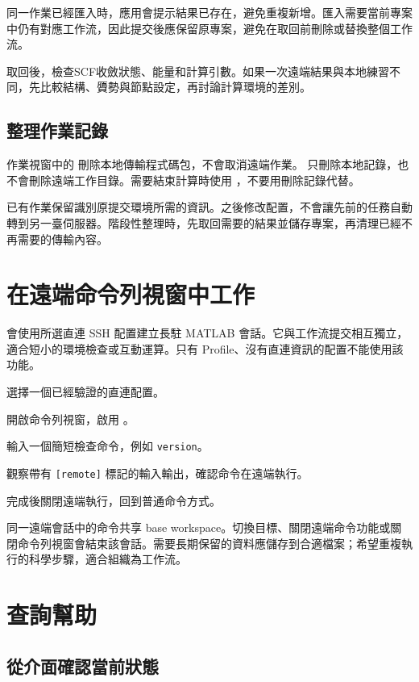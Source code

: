 同一作業已經匯入時，應用會提示結果已存在，避免重複新增。匯入需要當前專案中仍有對應工作流，因此提交後應保留原專案，避免在取回前刪除或替換整個工作流。

取回後，檢查SCF收斂狀態、能量和計算引數。如果一次遠端結果與本地練習不同，先比較結構、贗勢與節點設定，再討論計算環境的差別。

\subsection{整理作業記錄}

作業視窗中的  刪除本地傳輸程式碼包，不會取消遠端作業。 只刪除本地記錄，也不會刪除遠端工作目錄。需要結束計算時使用 ，不要用刪除記錄代替。

已有作業保留識別原提交環境所需的資訊。之後修改配置，不會讓先前的任務自動轉到另一臺伺服器。階段性整理時，先取回需要的結果並儲存專案，再清理已經不再需要的傳輸內容。

\section{在遠端命令列視窗中工作}

 會使用所選直連 SSH 配置建立長駐 MATLAB\regmark{} 會話。它與工作流提交相互獨立，適合短小的環境檢查或互動運算。只有 Profile、沒有直連資訊的配置不能使用該功能。

\begin{steps}
\item 選擇一個已經驗證的直連配置。
\item 開啟命令列視窗，啟用 。
\item 輸入一個簡短檢查命令，例如 \texttt{version}。
\item 觀察帶有 \texttt{[remote]} 標記的輸入輸出，確認命令在遠端執行。
\item 完成後關閉遠端執行，回到普通命令方式。
\end{steps}

同一遠端會話中的命令共享 base workspace。切換目標、關閉遠端命令功能或關閉命令列視窗會結束該會話。需要長期保留的資料應儲存到合適檔案；希望重複執行的科學步驟，適合組織為工作流。

\section{查詢幫助}

\subsection{從介面確認當前狀態}

